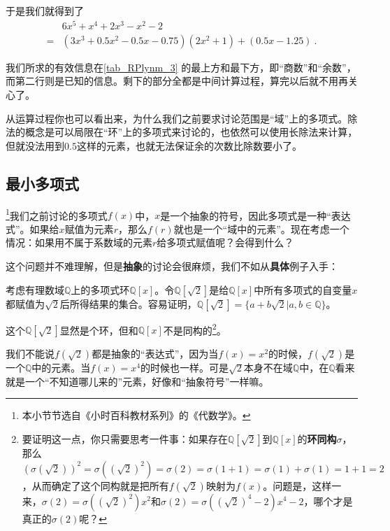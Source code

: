 于是我们就得到了
\begin{equation}
\begin{aligned}
&6x^5+x^4+2x^3-x^2-2 \\
= &(3x^3+0.5x^2-0.5x-0.75)(2x^2+1)+(0.5x-1.25)~.
\end{aligned}
\end{equation}

我们所求的有效信息在\autoref{tab_RPlynm_3} 的最上方和最下方，即“商数”和“余数”，而第二行则是已知的信息。剩下的部分全都是中间计算过程，算完以后就不用再关心了。

从运算过程你也可以看出来，为什么我们之前要求讨论范围是“域”上的多项式。除法的概念是可以局限在“环”上的多项式来讨论的，也依然可以使用长除法来计算，但就没法用到$0.5$这样的元素，也就无法保证余的次数比除数要小了。





\subsection{最小多项式}



\footnote{本小节节选自《小时百科教材系列》的《代数学》。}我们之前讨论的多项式$f(x)$中，$x$是一个抽象的符号，因此多项式是一种“表达式”。如果给$x$赋值为元素$r$，那么$f(r)$就也是一个“域中的元素”。现在考虑一个情况：如果用不属于系数域的元素$r$给多项式赋值呢？会得到什么？

这个问题并不难理解，但是\textbf{抽象}的讨论会很麻烦，我们不如从\textbf{具体}例子入手：

\begin{example}{}

考虑有理数域$\mathbb{Q}$上的多项式环$\mathbb{Q}[x]$。令$\mathbb{Q}[\sqrt{2}]$是给$\mathbb{Q}[x]$中所有多项式的自变量$x$都赋值为$\sqrt{2}$后所得结果的集合。容易证明，$\mathbb{Q}[\sqrt{2}]=\{ a+b\sqrt{2}|a, b\in\mathbb{Q} \}$。

这个$\mathbb{Q}[\sqrt{2}]$显然是个环，但和$\mathbb{Q}[x]$不是同构的\footnote{要证明这一点，你只需要思考一件事：如果存在$\mathbb{Q}[\sqrt{2}]$到$\mathbb{Q}[x]$的\textbf{环同构}$\sigma$，那么$(\sigma(\sqrt{2}))^2=\sigma((\sqrt{2})^2)=\sigma(2)=\sigma(1+1)=\sigma(1)+\sigma(1)=1+1=2$，从而确定了这个同构就是把所有$f(\sqrt{2})$映射为$f(x)$。问题是，这样一来，$\sigma(2)=\sigma((\sqrt{2})^2)x^2$和$\sigma(2)=\sigma((\sqrt{2})^4-2)x^4-2$，哪个才是真正的$\sigma(2)$呢？}。


\end{example}


我们不能说$f(\sqrt{2})$都是抽象的“表达式”，因为当$f(x)=x^2$的时候，$f(\sqrt{2})$是一个$\mathbb{Q}$中的元素。当$f(x)=x^4$的时候也一样。可是$\sqrt{2}$本身不在域$\mathbb{Q}$中，在$\mathbb{Q}$看来就是一个“不知道哪儿来的”元素，好像和“抽象符号”一样嘛。

